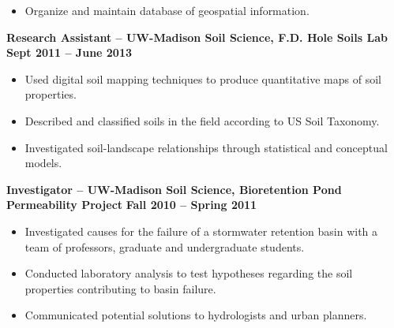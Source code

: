 \documentclass{article}
\begin{document}
\begin{small}
\begin{itemize}
\item Organize and maintain database of geospatial information.
\end{itemize}
\noindent \textbf{Research Assistant -- UW-Madison Soil Science, F.D. Hole Soils Lab} \hfill \textbf{Sept 2011 -- June 2013}
\begin{itemize}
\item Used digital soil mapping techniques to produce quantitative maps of soil properties.
\item Described and classified soils in the field according to US Soil Taxonomy.
\item Investigated soil-landscape relationships through statistical and conceptual models.
\end{itemize}
\noindent \textbf{Investigator -- UW-Madison Soil Science, Bioretention Pond Permeability Project} \hfill \textbf{Fall 2010 -- Spring 2011}
\begin{itemize}
\item Investigated causes for the failure of a stormwater retention basin with a team of professors, graduate and undergraduate students.
\item Conducted laboratory analysis to test hypotheses regarding the soil properties contributing to basin failure.
\item Communicated potential solutions to hydrologists and urban planners.\\
\end{itemize}
\end{small}
\end{document}
